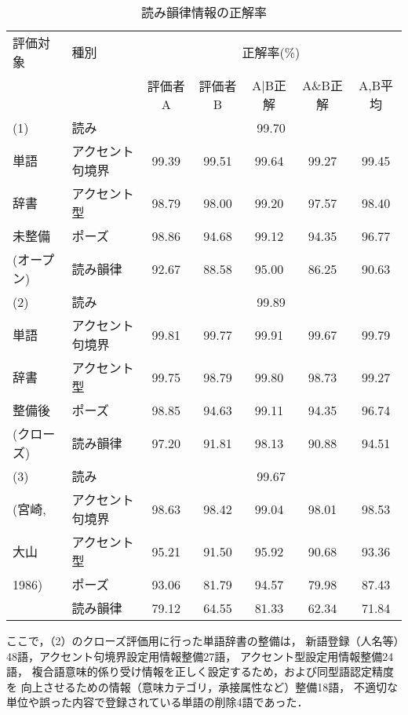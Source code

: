 \begin{table}[tb]
\caption{読み韻律情報の正解率}
\label{tab:evaluation}
\begin{center}
\begin{tabular}{|l|l|ccccc|}\hline
評価対象 & 種別	& \multicolumn{5}{|c|}{正解率(\%)}\\ \cline{3-7}
 & 	    	& 評価者A & 評価者B & A$\mid$B正解 & A\&B正解 & A,B平均\\\hline
(1) & 読み	& \multicolumn{5}{|c|}{99.70} \\
単語 & アクセント句境界 & 99.39 & 99.51 & 99.64 & 99.27 & 99.45 \\
辞書 & アクセント型	& 98.79 & 98.00 & 99.20 & 97.57 & 98.40 \\
未整備 &ポーズ		& 98.86 & 94.68 & 99.12 & 94.35 & 96.77 \\
(オープン) & 読み韻律	& 92.67 & 88.58 & 95.00 & 86.25 & 90.63 \\ \hline
(2) & 読み	& \multicolumn{5}{|c|}{99.89} \\
単語 & アクセント句境界 & 99.81 & 99.77 & 99.91 & 99.67 & 99.79 \\
辞書 & アクセント型	& 99.75 & 98.79 & 99.80 & 98.73 & 99.27 \\
整備後 & ポーズ		& 98.85 & 94.63 & 99.11 & 94.35 & 96.74 \\
(クローズ) & 読み韻律	& 97.20 & 91.81 & 98.13 & 90.88 & 94.51 \\ \hline
(3) & 読み	& \multicolumn{5}{|c|}{99.67} \\
(宮崎, & アクセント句境界 & 98.63 & 98.42 & 99.04 & 98.01 & 98.53 \\
大山   & アクセント型	& 95.21 & 91.50 & 95.92 & 90.68 & 93.36 \\
1986)  & ポーズ		& 93.06 & 81.79 & 94.57 & 79.98 & 87.43 \\
       & 読み韻律	& 79.12 & 64.55 & 81.33 & 62.34 & 71.84 \\ \hline
\end{tabular}
\end{center}
\end{table}

ここで，（2）のクローズ評価用に行った単語辞書の整備は，
新語登録（人名等）48語，アクセント句境界設定用情報整備27語，
アクセント型設定用情報整備24語，
複合語意味的係り受け情報を正しく設定するため，および同型語認定精度を
向上させるための情報（意味カテゴリ，承接属性など）整備18語，
不適切な単位や誤った内容で登録されている単語の削除4語であった．

